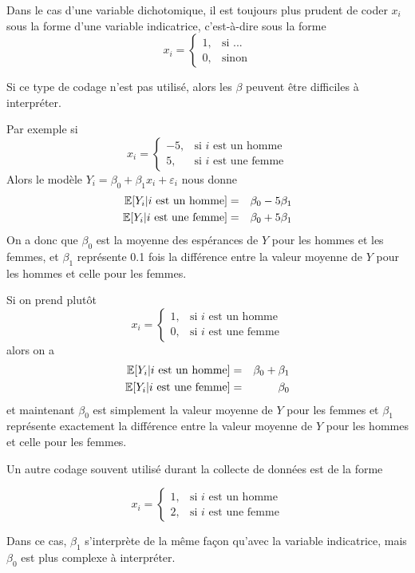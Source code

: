 Dans le cas d'une variable dichotomique, il est toujours plus prudent de coder $x_i$ sous la forme d'une variable indicatrice, c'est-à-dire sous la forme
$$x_i=\left\{\begin{array}{ll} 1, & \mbox{si ...}\\
0, & \mbox{sinon}\end{array}\right.$$

Si ce type de codage n'est pas utilisé, alors les $\beta$ peuvent \^etre difficiles à
interpréter.

Par exemple si
$$x_{i}=\left\{\begin{array}{ll}-5, & \mbox{si $i$ est un homme}\\
5, & \mbox{si $i$ est une femme}\end{array}\right.$$
Alors le modèle $Y_i=\beta_0+\beta_1 x_i+\varepsilon_i$ nous donne
\begin{eqnarray*}
\mathbb{E}[Y_i|\mbox{$i$ est un homme}]&=&\beta_0-5\beta_1\\
\mathbb{E}[Y_i|\mbox{$i$ est une femme}]&=&\beta_0+5\beta_1
\end{eqnarray*}
On a donc que $\beta_0$ est la moyenne des espérances de $Y$ pour les hommes et les femmes, et $\beta_1$ représente 0.1 fois la différence entre la valeur moyenne de $Y$ pour les hommes et celle pour les femmes.

Si on prend plutôt
$$x_{i}=\left\{\begin{array}{ll}1, & \mbox{si $i$ est un homme}\\
0, & \mbox{si $i$ est une femme}\end{array}\right.$$ alors on a
\begin{eqnarray*}
\mathbb{E}[Y_i|\mbox{$i$ est un homme}]&=&\beta_0+\beta_1\\
\mathbb{E}[Y_i|\mbox{$i$ est une femme}]&=&\beta_0
\end{eqnarray*}
et maintenant $\beta_0$ est simplement la valeur moyenne de $Y$ pour les femmes et  $\beta_1$ représente exactement la différence entre la valeur moyenne de $Y$ pour les hommes et celle pour les femmes.

Un autre codage souvent utilisé durant la collecte de données est de la forme

$$x_{i}=\left\{\begin{array}{ll}1, & \mbox{si $i$ est un homme}\\
2, & \mbox{si $i$ est une femme}\end{array}\right.$$

Dans ce cas, $\beta_1$ s'interprète de la même façon qu'avec la variable indicatrice, mais $\beta_0$ est plus complexe à interpréter.

